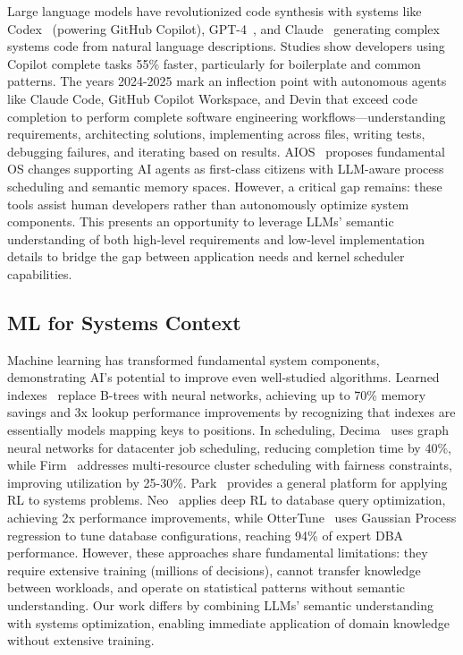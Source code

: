 Large language models have revolutionized code synthesis with systems like Codex~\cite{chen2021codex} (powering GitHub Copilot), GPT-4~\cite{openai2023gpt4}, and Claude~\cite{anthropic2024claude} generating complex systems code from natural language descriptions. Studies show developers using Copilot complete tasks 55\% faster, particularly for boilerplate and common patterns. The years 2024-2025 mark an inflection point with autonomous agents like Claude Code, GitHub Copilot Workspace, and Devin that exceed code completion to perform complete software engineering workflows—understanding requirements, architecting solutions, implementing across files, writing tests, debugging failures, and iterating based on results. AIOS~\cite{mei2024aios} proposes fundamental OS changes supporting AI agents as first-class citizens with LLM-aware process scheduling and semantic memory spaces. However, a critical gap remains: these tools assist human developers rather than autonomously optimize system components. This presents an opportunity to leverage LLMs' semantic understanding of both high-level requirements and low-level implementation details to bridge the gap between application needs and kernel scheduler capabilities.

\subsection{ML for Systems Context}

Machine learning has transformed fundamental system components, demonstrating AI's potential to improve even well-studied algorithms. Learned indexes~\cite{kraska2018learned} replace B-trees with neural networks, achieving up to 70\% memory savings and 3x lookup performance improvements by recognizing that indexes are essentially models mapping keys to positions. In scheduling, Decima~\cite{mao2019decima} uses graph neural networks for datacenter job scheduling, reducing completion time by 40\%, while Firm~\cite{qiu2020firm} addresses multi-resource cluster scheduling with fairness constraints, improving utilization by 25-30\%. Park~\cite{mao2019park} provides a general platform for applying RL to systems problems. Neo~\cite{marcus2019neo} applies deep RL to database query optimization, achieving 2x performance improvements, while OtterTune~\cite{vanaken2017ottertune} uses Gaussian Process regression to tune database configurations, reaching 94\% of expert DBA performance. However, these approaches share fundamental limitations: they require extensive training (millions of decisions), cannot transfer knowledge between workloads, and operate on statistical patterns without semantic understanding. Our work differs by combining LLMs' semantic understanding with systems optimization, enabling immediate application of domain knowledge without extensive training.